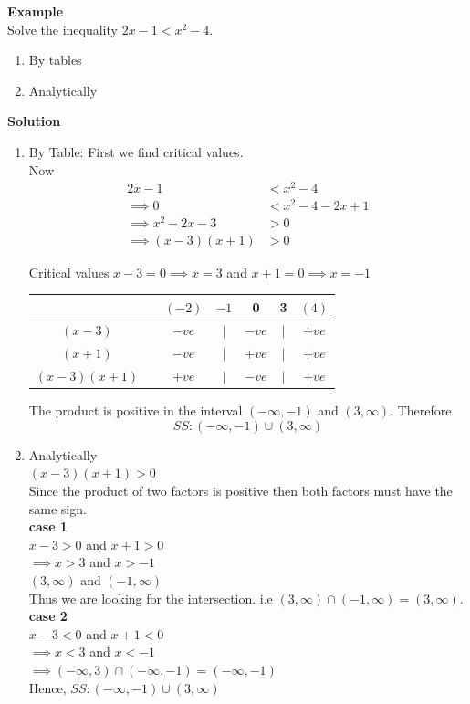 \documentclass[11pt,a4paper]{article}
\begin{document}
\textbf{Example}\\
Solve the inequality $2x-1<x^2-4$.
\begin{enumerate}
\item By tables
\item Analytically\\
\end{enumerate}

\textbf{Solution}
\begin{enumerate}
\item By Table: First we find critical values.\\

Now
\begin{align*}
2x-1 & < x^2-4\\
\implies 0 &< x^2-4-2x+1\\
\implies x^2-2x-3 &>0\\
\implies (x-3)(x+1)&>0
\end{align*}

Critical values $x-3=0\implies x=3$ and $x+1=0\implies x=-1$\\


\begin{table}[H]
\centering
\begin{tabular}{ccccccc}
&& $(-2)$ & $-1$ & 0 & 3 & $(4)$\\
\hline 
$(x-3)$ & \multicolumn{1}{r|}{} & $-ve$ & $|$ & $-ve$ & $|$ & $+ve$\\
$(x+1)$ & \multicolumn{1}{r|}{} & $-ve$ & $|$ & $+ve$ & $|$ & $+ve$\\
$(x-3)(x+1)$ & \multicolumn{1}{r|}{} & $+ve$ & $|$ & $-ve$ & $|$ & $+ve$\\
\end{tabular}
\end{table}

The product is positive in the interval $(-\infty,-1)$ and $(3,\infty)$. Therefore $$SS:(-\infty,-1)\cup (3,\infty)$$

\item Analytically\\
$(x-3)(x+1)>0$\\
Since the product of two factors is positive then both factors must have the same sign.\\

\textbf{case 1}\\
$x-3>0$ and $x+1>0$\\
$\implies x>3$ and $x>-1$\\
$(3,\infty)$ and $(-1,\infty)$\\

Thus we  are looking for the intersection. i.e $(3,\infty)\cap (-1,\infty)=(3,\infty)$.\\

\textbf{case 2}\\
$x-3<0$ and $x+1<0$\\
$\implies x<3$ and $x<-1$\\
$\implies (-\infty,3)\cap (-\infty,-1)=(-\infty,-1)$\\

Hence, $SS:(-\infty,-1)\cup (3,\infty)$\\
\end{enumerate}
\end{document}
